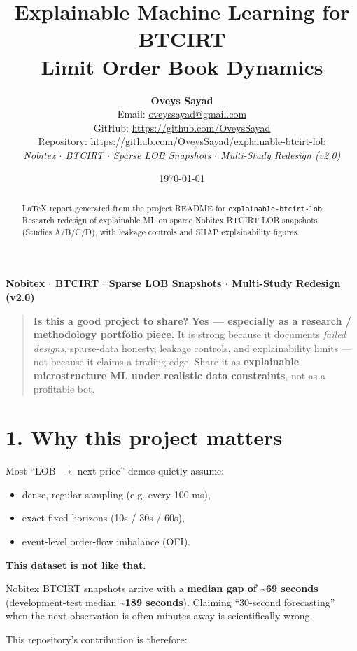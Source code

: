 \documentclass[11pt,a4paper]{article}
\title{Explainable Machine Learning for BTCIRT\\Limit Order Book Dynamics}
\author{%
  \textbf{Oveys Sayad}\\[0.6em]
  \normalsize
  Email: \href{mailto:oveyssayad@gmail.com}{oveyssayad@gmail.com}\\
  GitHub: \href{https://github.com/OveysSayad}{https://github.com/OveysSayad}\\
  Repository: \href{https://github.com/OveysSayad/explainable-btcirt-lob}{https://github.com/OveysSayad/explainable-btcirt-lob}\\[0.4em]
  \textit{Nobitex $\cdot$ BTCIRT $\cdot$ Sparse LOB Snapshots $\cdot$ Multi-Study Redesign (v2.0)}
}
\date{\today}
\begin{document}
\maketitle
\begin{abstract}
LaTeX report generated from the project README for \texttt{explainable-btcirt-lob}.
Research redesign of explainable ML on sparse Nobitex BTCIRT LOB snapshots
(Studies A/B/C/D), with leakage controls and SHAP explainability figures.
\end{abstract}
\tableofcontents
\newpage


\textbf{Nobitex $\cdot$ BTCIRT $\cdot$ Sparse LOB Snapshots $\cdot$ Multi-Study Redesign (v2.0)}



\begin{quote}
\textbf{Is this a good project to share?} \textbf{Yes --- especially as a research / methodology portfolio piece.} It is strong because it documents \textit{failed designs}, sparse-data honesty, leakage controls, and explainability limits --- not because it claims a trading edge. Share it as \textbf{explainable microstructure ML under realistic data constraints}, not as a profitable bot.
\end{quote}

\vspace{0.5em}

\section{1. Why this project matters}

Most ``LOB $\rightarrow$ next price'' demos quietly assume:


\begin{itemize}
\item dense, regular sampling (e.g. every 100 ms),
\item exact fixed horizons (10s / 30s / 60s),
\item event-level order-flow imbalance (OFI).
\end{itemize}

\textbf{This dataset is not like that.}


Nobitex BTCIRT snapshots arrive with a \textbf{median gap of \textasciitilde{}69 seconds} (development-test median \textasciitilde{}\textbf{189 seconds}). Claiming ``30-second forecasting'' when the next observation is often minutes away is scientifically wrong.


This repository's contribution is therefore:
\end{document}
